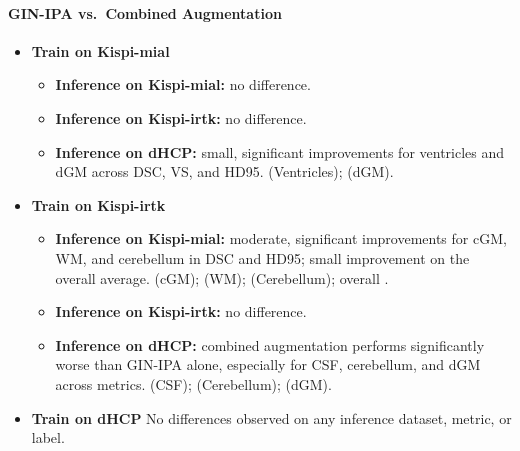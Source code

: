 \paragraph{GIN-IPA vs.\ Combined Augmentation}
\begin{itemize}
    \item \textbf{Train on Kispi-mial}
    \begin{itemize}
        \item \textbf{Inference on Kispi-mial:} no difference.
        \item \textbf{Inference on Kispi-irtk:} no difference.
        \item \textbf{Inference on dHCP:} small, significant improvements for ventricles and dGM across DSC, VS, and HD95. \stats{\,}{\,} (Ventricles); \stats{\,}{\,} (dGM).
    \end{itemize}
    \item \textbf{Train on Kispi-irtk}
    \begin{itemize}
        \item \textbf{Inference on Kispi-mial:} moderate, significant improvements for cGM, WM, and cerebellum in DSC and HD95; small improvement on the overall average. \stats{\,}{\,} (cGM); \stats{\,}{\,} (WM); \stats{\,}{\,} (Cerebellum); overall \stats{\,}{\,}.
        \item \textbf{Inference on Kispi-irtk:} no difference.
        \item \textbf{Inference on dHCP:} combined augmentation performs significantly worse than GIN-IPA alone, especially for CSF, cerebellum, and dGM across metrics. \stats{\,}{\,} (CSF); \stats{\,}{\,} (Cerebellum); \stats{\,}{\,} (dGM).
    \end{itemize}
    \item \textbf{Train on dHCP}
    No differences observed on any inference dataset, metric, or label.
\end{itemize}

